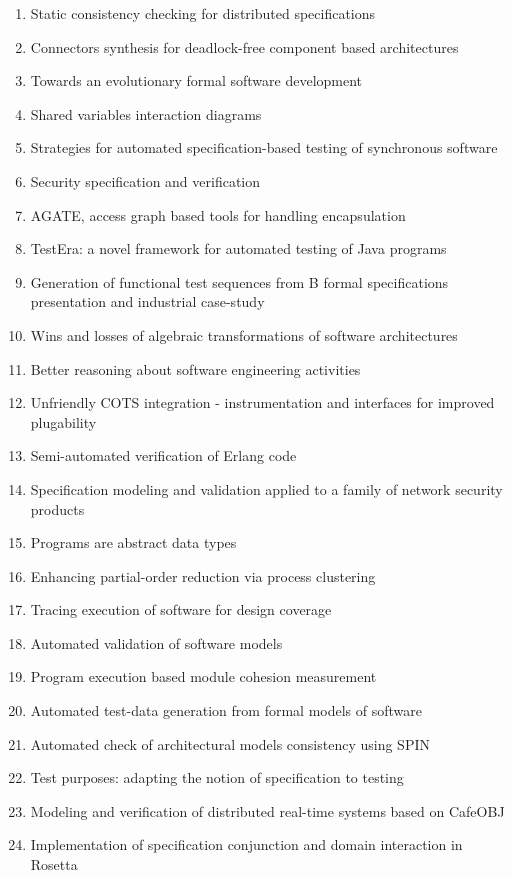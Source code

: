 \begin{enumerate}[itemsep=-1ex]
  \item Static consistency checking for distributed specifications
  \item Connectors synthesis for deadlock-free component based architectures
  \item Towards an evolutionary formal software development
  \item Shared variables interaction diagrams
  \item Strategies for automated specification-based testing of synchronous software
  \item Security specification and verification
  \item AGATE, access graph based tools for handling encapsulation
  \item TestEra: a novel framework for automated testing of Java programs
  \item Generation of functional test sequences from B formal specifications presentation and industrial case-study
  \item Wins and losses of algebraic transformations of software architectures
  \item Better reasoning about software engineering activities
  \item Unfriendly COTS integration - instrumentation and interfaces for improved plugability
  \item Semi-automated verification of Erlang code
  \item Specification modeling and validation applied to a family of network security products
  \item Programs are abstract data types
  \item Enhancing partial-order reduction via process clustering
  \item Tracing execution of software for design coverage
  \item Automated validation of software models
  \item Program execution based module cohesion measurement
  \item Automated test-data generation from formal models of software
  \item Automated check of architectural models consistency using SPIN
  \item Test purposes: adapting the notion of specification to testing
  \item Modeling and verification of distributed real-time systems based on CafeOBJ
  \item Implementation of specification conjunction and domain interaction in Rosetta

\end{enumerate}
